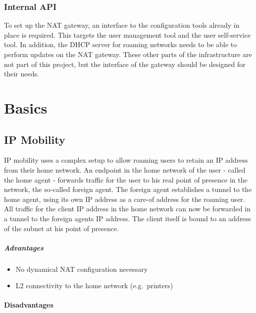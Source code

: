 \documentclass{report}
\begin{document}
\subsection{Internal API}\label{internal-api}

To set up the NAT gateway, an interface to the configuration tools already in
place is required. This targets the user management tool and the user
self-service tool. In addition, the DHCP server for roaming
networks needs to be able to perform updates on the NAT gateway. These
other parts of the infrastructure are not part of this project, but the
interface of the gateway should be designed for their needs.

\chapter{Basics}\label{basics}

\section{IP Mobility}\label{ip-mobility}

IP mobility\cite{IPMob}\cite{MobileIP-cisco} uses a complex setup to allow roaming users to retain an
IP address from their home network. An endpoint in the home network of the
user - called the home agent - forwards traffic for the user to his real
point of presence in the network, the so-called foreign agent. The
foreign agent establishes a tunnel to the home agent, using its own IP address
as a care-of address for the roaming user. All traffic for the client IP address in the home network
can now be forwarded in a tunnel to the foreign agents IP address. The client
itself is bound to an address of the subnet at his point of presence.

\paragraph{Advantages}\label{pro}

\begin{itemize}
\itemsep1pt\parskip0pt
\item
  No dynamical NAT configuration necessary
\item
  L2 connectivity to the home network (e.g.~printers)
\end{itemize}

\subsubsection{Disadvantages}\label{con}
\end{document}

